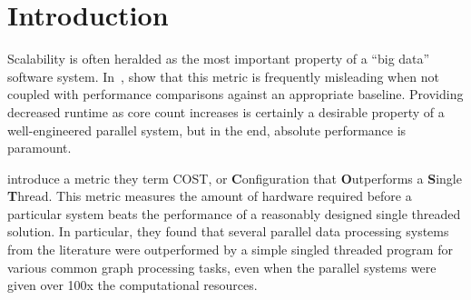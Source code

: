 \section{Introduction}
\label{sec:intro}

Scalability is often heralded as the most important property of a ``big data''
software system. In~\cite{McSherryCOST}, \citeauthor{McSherryCOST} show that
this metric is frequently misleading when not coupled with performance
comparisons against an appropriate baseline. Providing decreased runtime as core
count increases is certainly a desirable property of a well-engineered parallel
system, but in the end, absolute performance is paramount.

\citeauthor{McSherryCOST} introduce a metric they term COST, or
\textbf{C}onfiguration that \textbf{O}utperforms a \textbf{S}ingle
\textbf{T}hread. This metric measures the amount of hardware required before a
particular system beats the performance of a reasonably designed single threaded
solution. In particular, they found that several parallel data processing
systems from the literature were outperformed by a simple singled threaded
program for various common graph processing tasks, even when the parallel
systems were given over 100x the computational resources.


